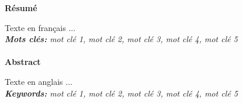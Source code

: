 \renewcommand{\headrulewidth}{0pt}
\fancyhead[R]{}

\begin{titlepage}
\newpage
\pagestyle{fancy}      
\lhead{}  
\chead{}     
\rhead{}     
    
\renewcommand{\headrulewidth}{0.5pt}

\begin{center}\huge{\textbf{Résumé}} \\ \end{center} 

    Texte en français ... \\ 
 
\emph{\textbf{Mots clés:} mot clé 1, mot clé 2, mot clé 3, mot clé 4, mot clé 5}

\paragraph{}

\begin{center}\huge{\textbf{Abstract}} \\ \end{center}

		Texte en anglais ... \\

\emph{\textbf{Keywords:} mot clé 1, mot clé 2, mot clé 3, mot clé 4, mot clé 5}

\end{titlepage}